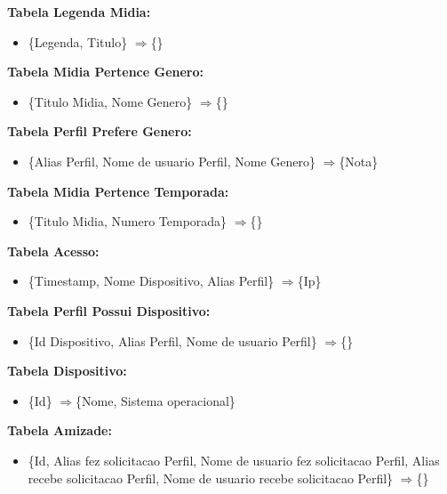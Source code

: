 \documentclass[12pt,a4paper]{article}
\newcommand{\rarrow}{$\Longrightarrow$}
\begin{document}
    {\bf Tabela Legenda Midia: }
    \begin{itemize}
        \item \{Legenda, Titulo\} \rarrow \{\} \\
    \end{itemize}
    
    {\bf Tabela Midia Pertence Genero: }
    \begin{itemize}
        \item \{Titulo Midia, Nome Genero\} \rarrow \{\} \\
    \end{itemize}
    
    {\bf Tabela Perfil Prefere Genero: }
    \begin{itemize}
        \item \{Alias Perfil, Nome de usuario Perfil, Nome Genero\} \rarrow \{Nota\} \\
    \end{itemize}
    
    {\bf Tabela Midia Pertence Temporada: }
    \begin{itemize}
        \item \{Titulo Midia, Numero Temporada\} \rarrow \{\} \\
    \end{itemize}
    
    {\bf Tabela Acesso: }
    \begin{itemize}
        \item \{Timestamp, Nome Dispositivo, Alias Perfil\} \rarrow \{Ip\} \\
    \end{itemize}
    
    {\bf Tabela Perfil Possui Dispositivo: }
    \begin{itemize}
        \item \{Id Dispositivo, Alias Perfil, Nome de usuario Perfil\} \rarrow \{\} \\
    \end{itemize}
    
    {\bf Tabela Dispositivo: }
    \begin{itemize}
        \item \{Id\} \rarrow \{Nome, Sistema operacional\} \\
    \end{itemize}
    
    {\bf Tabela Amizade: }
    \begin{itemize}
        \item \{Id, Alias fez solicitacao Perfil, Nome de usuario fez solicitacao Perfil, Alias recebe solicitacao Perfil, Nome de usuario recebe solicitacao Perfil\} \rarrow \{\} \\
    \end{itemize}
    
\end{document}
